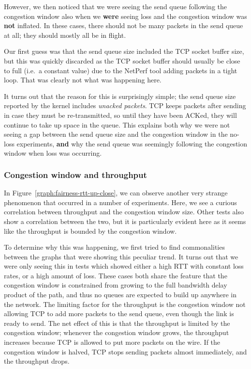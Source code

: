 However, we then noticed that we were seeing the send queue following the
congestion window also when we \textbf{were} seeing loss and the congestion
window was \textbf{not} inflated. In these cases, there should not be many
packets in the send queue at all; they should mostly all be in flight.

Our first guess was that the send queue size included the TCP socket buffer
size, but this was quickly discarded as the TCP socket buffer should usually be
close to full (i.e.\ a constant value) due to the NetPerf tool adding packets in
a tight loop. That was clearly not what was happening here.

It turns out that the reason for this is surprisingly simple; the send queue
size reported by the kernel includes \textit{unacked packets}. TCP keeps packets
after sending in case they must be re-transmitted, so until they have been
ACKed, they will continue to take up space in the queue. This explains both why
we were not seeing a gap between the send queue size and the congestion window
in the no-loss experiments, \textbf{and} why the send queue was seemingly
following the congestion window when loss was occurring.

\subsubsection{Congestion window and throughput}

In Figure~\ref{graph:fairness-rtt-up-close}, we can observe another very strange
phenomenon that occurred in a number of experiments. Here, we see a curious
correlation between throughput and the congestion window size. Other tests also
show a correlation between the two, but it is particularly evident here as it 
seems like the throughput is bounded by the congestion window.

To determine why this was happening, we first tried to find commonalities
between the graphs that were showing this peculiar trend. It turns out that we
were only seeing this in tests which showed either a high RTT with constant loss
rates, or a high amount of loss. These cases both share the feature that the
congestion window is constrained from growing to the full bandwidth delay
product of the path, and thus no queues are expected to build up anywhere in the
network. The limiting factor for the throughput is the congestion window not
allowing TCP to add more packets to the send queue, even though the link is
ready to send. The net effect of this is that the throughput is limited by the
congestion window; whenever the congestion window grows, the throughput
increases because TCP is allowed to put more packets on the wire. If the
congestion window is halved, TCP stops sending packets almost immediately, and
the throughput drops.
